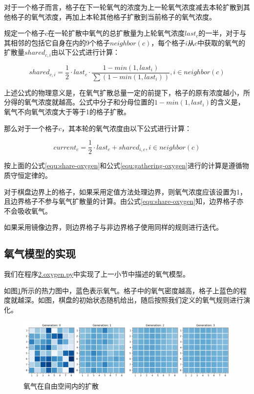 \documentclass{ctexart}
\begin{document}
对于一个格子而言，格子在下一轮氧气的浓度为上一轮氧气浓度减去本轮扩散到其他格子的氧气浓度，再加上本轮其他格子扩散到当前格子的氧气浓度。

规定一个格子$c$在一轮扩散中氧气的总扩散量为上轮氧气浓度$last_c$的一半，对于与其相邻的包括它自身在内的9个格子$neighbor(c)$，每个格子$i$从$c$中获取的氧气的扩散量$shared_{c, i}$由以下公式进行计算：

\begin{equation}
  \label{equ:share-oxygen}
  shared_{c, i} = \frac{1}{2} \cdot last_c \cdot \frac{1 - min(1, last_i)}{\sum (1 - min(1, last_i))}, i \in neighbor(c)
\end{equation}

上述公式的物理意义是，在氧气扩散总量一定的前提下，格子的原有浓度越小，所分得的氧气浓度就越高。公式中分子和分母位置的$1 - min(1, last_i)$的含义是，氧气不向氧气浓度大于等于1的格子扩散。

那么对于一个格子$c$，其本轮的氧气浓度由以下公式进行计算：

\begin{equation}
  \label{equ:gathering-oxygen}
  current_c = \frac{1}{2} \cdot last_c + shared_{i, c} , i \in neighbor(c)
\end{equation}

按上面的公式\ref{equ:share-oxygen}和公式\ref{equ:gathering-oxygen}进行的计算是遵循物质守恒定律的。

对于棋盘边界上的格子，如果采用定值方法处理边界，则氧气浓度应该设置为1，且边界格子不参与氧气扩散量的计算。由公式\ref{equ:share-oxygen}知，边界格子亦不会吸收氧气。

如果采用镜像边界，则边界格子与非边界格子使用同样的规则进行迭代。

\subsection{氧气模型的实现}

我们在程序\underline{2.oxygen.py}中实现了上一小节中描述的氧气模型。

如图\ref{fig:oxygen-flow}所示的热力图中，蓝色表示氧气。格子中的氧气密度越高，格子上蓝色的程度就越深。如图，棋盘的初始状态随机给出，随后按照我们定义的氧气规则进行演化。

\begin{figure}[ht]
  \centering
  \includegraphics[width=\textwidth]{oxygen-flow.png}
  \caption{氧气在自由空间内的扩散}
  \label{fig:oxygen-flow}
\end{figure}
\end{document}
